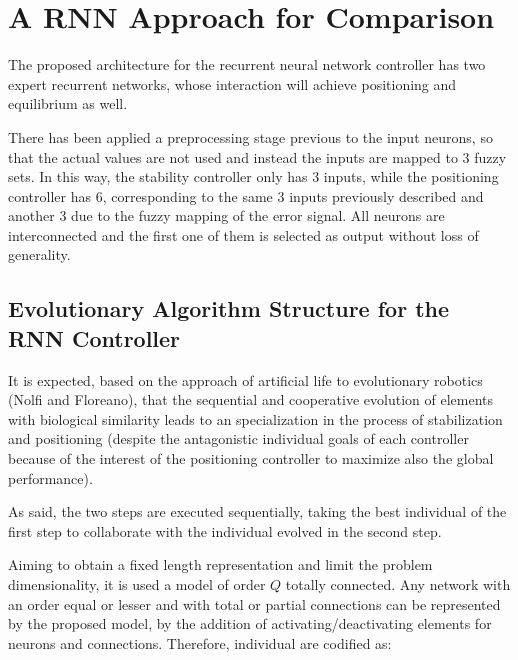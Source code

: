 \section{A RNN Approach for Comparison}
The proposed architecture for the recurrent neural network controller
has two expert recurrent networks, whose interaction will achieve
positioning and equilibrium as well.

There has been applied a preprocessing stage previous to the input
neurons, so that the actual values are not used and instead the inputs
are mapped to 3 fuzzy sets. In this way, the stability controller only
has 3 inputs, while the positioning controller has 6, corresponding to
the same 3 inputs previously described and another 3 due to the fuzzy
mapping of the error signal. All neurons are interconnected and the
first one of them is selected as output without loss of
generality. 


\subsection{Evolutionary Algorithm Structure for the RNN Controller}
It is expected, based on the approach of artificial life to
evolutionary robotics (Nolfi and Floreano), that the sequential and
cooperative evolution of elements with biological similarity leads to
an specialization in the process of stabilization and positioning
(despite the antagonistic individual goals of each controller because
of the interest of the positioning controller to maximize also the
global performance).

As said, the two steps are executed sequentially, taking the best
individual of the first step to collaborate with the individual
evolved in the second step.

Aiming to obtain a fixed length representation and limit the problem
dimensionality, it is used a model of order $Q$ totally connected. Any
network with an order equal or lesser and with total or partial
connections can be represented by the proposed model, by the addition
of activating/deactivating elements for neurons and
connections. Therefore, individual are codified as:

